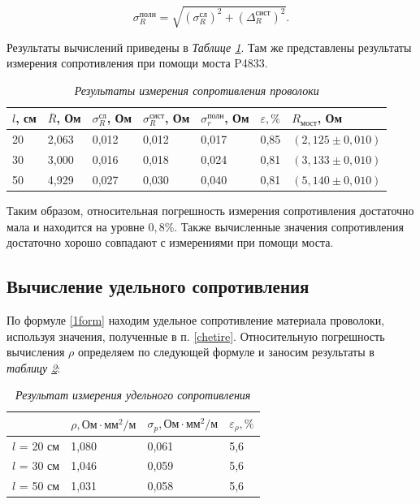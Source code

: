 \documentclass[a4paper,12pt]{article} %
\begin{document}
\begin{equation}
\sigma^\text{полн}_R = \sqrt{\left( \sigma^\text{сл}_R \right)^2 + \left( \Delta_R^\text{сист} \right)^2 }.
\end{equation}




\label{chetire}

Результаты вычислений приведены в \textit{Таблице \ref{tab:rezult}}. Там же представлены результаты измерения сопротивления при помощи моста P4833.

\begin{table}[h!]
	\begin{tabular}{|l|l|l|l|l|l|l|}
		\hline
		$l$, см & $\overline{R}$, Ом & $ \sigma_R^\text{сл} $, Ом & $ \sigma_R^\text{сист} $, Ом & $ \sigma_r^\text{полн} $, Ом & $ \varepsilon, \% $ & $ R_\text{мост} $, Ом \\ \hline
		20 & 2,063 & 0,012 & 0,012 & 0,017 & 0,85 & $ (2,125 \pm 0,010) $ \\ \hline
		30 & 3,000 & 0,016 & 0,018 & 0,024 & 0,81 & $ (3,133 \pm 0,010) $ \\ \hline
		50 & 4,929 & 0,027 & 0,030 & 0,040 & 0,81 & $ (5,140 \pm 0,010) $ \\ \hline
	\end{tabular}
\caption{\textit{Результаты измерения сопротивления проволоки}}
\label{tab:rezult}
\end{table}



	
	
Таким образом, относительная погрешность измерения сопротивления достаточно мала и находится на уровне $ 0,8\% $. Также вычисленные значения сопротивления достаточно хорошо совпадают с измерениями при помощи моста.	

\subsection{Вычисление удельного сопротивления}

По формуле \eqref{1form} находим удельное сопротивление материала проволоки, используя значения, полученные в п. \ref{chetire}. Относительную погрешность вычисления $ \rho $ определяем по следующей формуле и заносим результаты в \textit{таблицу \ref{rezi}}:


\begin{table}[h!]

	\begin{tabular}{|l|l|l|l|}
		\hline
		& $ \rho , \text{Ом} \cdot \text{мм}^2 / \text{м} $   & $ \sigma_p, \text{Ом} \cdot \text{мм}^2 / \text{м} $ & $ \varepsilon_\rho, \% $   \\ \hline
		$l$ = 20 см & 1,080 & 0,061 & 5,6 \\ \hline
		$l$ = 30 см & 1,046 & 0,059 & 5,6 \\ \hline
		$l$ = 50 см & 1,031 & 0,058 & 5,6 \\ \hline
	\end{tabular}
	\caption{\textit{Результат измерения удельного сопротивления}}\label{rezi}
\end{table}
\end{document}
